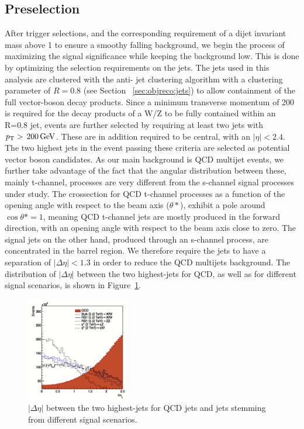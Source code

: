 \subsection{Preselection} 
\label{sec:searchI:preselection}
After trigger selections, and the corresponding requirement of a dijet invariant mass above 1 \TeV to ensure a smoothy falling background, we begin the process of maximizing the signal significance while keeping the background low. This is done by optimizing the selection requirements on the jets. The jets used in this analysis are clustered with the anti-\kt{} jet clustering algorithm with a clustering parameter of $R=0.8$ (see Section ~\ref{sec:objreco:jets}) to allow containment of the full vector-boson decay products. Since a minimum transverse momentum of 200 \GeV is required for the decay products of a W/Z to be fully contained within an R=0.8 jet, events are further selected by requiring at least two jets with $p_{\mathrm{T}} > \text{\,200}{\ensuremath{\,\text{Ge\hspace{-.08em}V}}}$. These are in addition required to be central, with an $|\eta| < 2.4$. The two highest \PT jets in the event passing these criteria are selected as potential vector boson candidates. As our main background is QCD multijet events, we further take advantage of the fact that the angular distribution between these, mainly t-channel, processes are very different from the s-channel signal processes under study. The crossection for QCD t-channel processes as a function of the opening angle with respect to the beam axis ($\theta*$), exhibit a pole around $\cos \theta*=1$, meaning QCD t-channel jets are mostly produced in the forward direction, with an opening angle with respect to the beam axis close to zero. The signal jets on the other hand, produced through an s-channel process, are concentrated in the barrel region. We therefore require the jets to have a separation of $|\Delta\eta|<1.3$ in order to reduce the QCD multijets background. The distribution of $|\Delta\eta|$ between the two highest-\PT jets for QCD, as well as for different signal scenarios, is shown in Figure~\ref{fig:searchI:detaopt}.
\begin{figure}[h!]
\centering
\includegraphics[width=0.4\textwidth]{figures/analysis/search1/misc/deta_opt.png}
\caption{ $|\Delta\eta|$  between the two highest-\PT jets for QCD jets and jets stemming from different signal scenarios.}
\label{fig:searchI:detaopt}
\end{figure}
